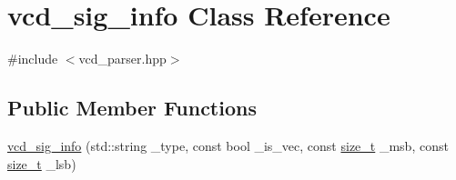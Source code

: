 \hypertarget{classvcd__sig__info}{}\section{vcd\+\_\+sig\+\_\+info Class Reference}
\label{classvcd__sig__info}


{\ttfamily \#include $<$vcd\+\_\+parser.\+hpp$>$}

\subsection*{Public Member Functions}
\begin{DoxyCompactItemize}
\item 
\hyperlink{classvcd__sig__info_a8282986d7af488cec8654feabc63960b}{vcd\+\_\+sig\+\_\+info} (std\+::string \+\_\+type, const bool \+\_\+is\+\_\+vec, const \hyperlink{tutorial__fpt__2017_2intro_2sixth_2test_8c_a7c94ea6f8948649f8d181ae55911eeaf}{size\+\_\+t} \+\_\+msb, const \hyperlink{tutorial__fpt__2017_2intro_2sixth_2test_8c_a7c94ea6f8948649f8d181ae55911eeaf}{size\+\_\+t} \+\_\+lsb)
\end{DoxyCompactItemize}
